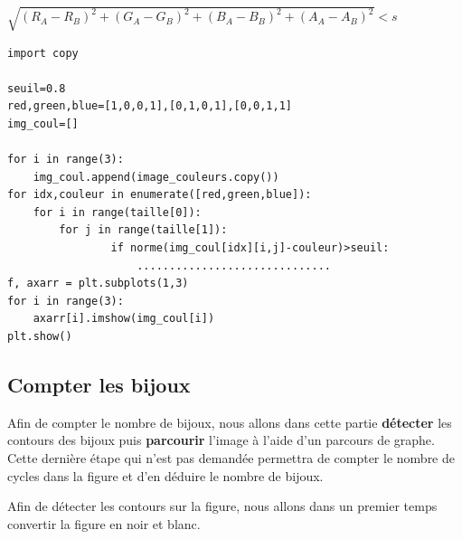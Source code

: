 \begin{center}
 $\sqrt{(R_A-R_B)^2+(G_A-G_B)^2+(B_A-B_B)^2+(A_A-A_B)^2}<s$
\end{center}



\newpage

\begin{verbatim}
import copy

seuil=0.8
red,green,blue=[1,0,0,1],[0,1,0,1],[0,0,1,1]
img_coul=[]

for i in range(3):
    img_coul.append(image_couleurs.copy())
for idx,couleur in enumerate([red,green,blue]):
    for i in range(taille[0]):
        for j in range(taille[1]):
                if norme(img_coul[idx][i,j]-couleur)>seuil:
                    ..............................
f, axarr = plt.subplots(1,3)
for i in range(3):
    axarr[i].imshow(img_coul[i])
plt.show()
\end{verbatim}

\subsection{Compter les bijoux}

Afin de compter le nombre de bijoux, nous allons dans cette partie \textbf{détecter} les contours des bijoux puis \textbf{parcourir} l'image à l'aide d'un parcours de graphe. Cette dernière étape qui n'est pas demandée permettra de compter le nombre de cycles dans la figure et d'en déduire le nombre de bijoux.

Afin de détecter les contours sur la figure, nous allons dans un premier temps convertir la figure en noir et blanc.




